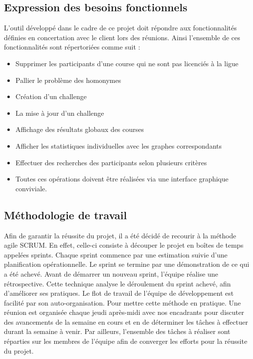 	\newpage
	\subsection{Expression des besoins fonctionnels}
	L’outil développé dans le cadre de ce projet doit répondre aux fonctionnalités définies en concertation avec le client lors des réunions. Ainsi l’ensemble de ces fonctionnalités sont répertoriées comme suit :
	\begin{itemize} 
	\item Supprimer les participants d'une course qui ne sont pas licenciés à la ligue	
	\item Pallier le problème des homonymes 
	\item Création d’un challenge
	\item La mise à jour d’un challenge
	\item Affichage des résultats globaux des courses
	\item Afficher les statistiques individuelles avec les graphes correspondants
	\item Effectuer des recherches des participants selon plusieurs critères
	\item Toutes ces opérations doivent être réalisées via une interface graphique conviviale.
	\end{itemize} 
	
	\subsection {Méthodologie de travail }
	Afin de garantir la réussite du projet, il a été décidé de recourir à la méthode agile SCRUM. En effet, celle-ci consiste à découper le projet en boîtes de temps appelées sprints. Chaque sprint commence par une estimation suivie d'une planification opérationnelle. Le sprint se termine par une démonstration de ce qui a été achevé. Avant de démarrer un nouveau sprint, l'équipe réalise une rétrospective. Cette technique analyse le déroulement du sprint achevé, afin d'améliorer ses pratiques. Le flot de travail de l'équipe de développement est facilité par son auto-organisation. 
	Pour mettre cette méthode en pratique. Une réunion est organisée chaque jeudi après-midi avec nos encadrants pour discuter des avancements de la semaine en cours et en de déterminer les tâches à effectuer durant la semaine à venir. Par ailleurs, l’ensemble des tâches à réaliser sont réparties sur les membres de l’équipe afin de converger les efforts pour la réussite du projet. 
	

